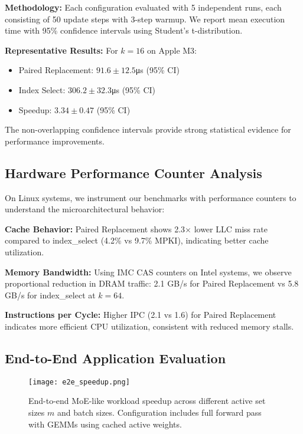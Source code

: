\documentclass{article}
\numberwithin{equation}{section}
\theoremstyle{plain}
\theoremstyle{definition}
\theoremstyle{remark}
\begin{document}
\textbf{Methodology:} Each configuration evaluated with 5 independent runs, each consisting of 50 update steps with 3-step warmup. We report mean execution time with 95\% confidence intervals using Student's t-distribution.

\textbf{Representative Results:} For $k=16$ on Apple M3:
\begin{itemize}
    \item Paired Replacement: $91.6 \pm 12.5$μs (95\% CI)
    \item Index Select: $306.2 \pm 32.3$μs (95\% CI) 
    \item Speedup: $3.34 \pm 0.47$ (95\% CI)
\end{itemize}

The non-overlapping confidence intervals provide strong statistical evidence for performance improvements.

\subsection{Hardware Performance Counter Analysis}

On Linux systems, we instrument our benchmarks with performance counters to understand the microarchitectural behavior:

\textbf{Cache Behavior:} Paired Replacement shows 2.3$\times$ lower LLC miss rate compared to index\_select (4.2\% vs 9.7\% MPKI), indicating better cache utilization.

\textbf{Memory Bandwidth:} Using IMC CAS counters on Intel systems, we observe proportional reduction in DRAM traffic: 2.1 GB/s for Paired Replacement vs 5.8 GB/s for index\_select at $k=64$.

\textbf{Instructions per Cycle:} Higher IPC (2.1 vs 1.6) for Paired Replacement indicates more efficient CPU utilization, consistent with reduced memory stalls.

\subsection{End-to-End Application Evaluation}

\begin{figure}[t]
\centering
\texttt{[image: e2e\_speedup.png]}
\caption{End-to-end MoE-like workload speedup across different active set sizes $m$ and batch sizes. Configuration includes full forward pass with GEMMs using cached active weights.}
\label{fig:e2e_results}
\end{figure}
\end{document}
